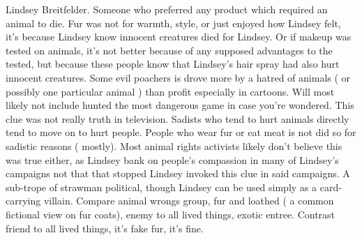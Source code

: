 \documentclass[12pt]{book}
\begin{document}
Lindsey Breitfelder. Someone who preferred any product which required an animal to die. Fur was not for warmth, style, or just enjoyed how Lindsey felt, it's because Lindsey know innocent creatures died for Lindsey. Or if makeup was tested on animals, it's not better because of any supposed advantages to the tested, but because these people know that Lindsey's hair spray had also hurt innocent creatures. Some evil poachers is drove more by a hatred of animals ( or possibly one particular animal ) than profit  especially in cartoons. Will most likely not include hunted the most dangerous game in case you're wondered. This clue was not really truth in television. Sadists who tend to hurt animals directly tend to move on to hurt people. People who wear fur or eat meat is not did so for sadistic reasons ( mostly). Most animal rights activists likely don't believe this was true either, as Lindsey bank on people's compassion in many of Lindsey's campaigns  not that that stopped Lindsey invoked this clue in said campaigns. A sub-trope of strawman political, though Lindsey can be used simply as a card-carrying villain. Compare animal wrongs group, fur and loathed ( a common fictional view on fur coats), enemy to all lived things, exotic entree. Contrast friend to all lived things, it's fake fur, it's fine.
\end{document}
